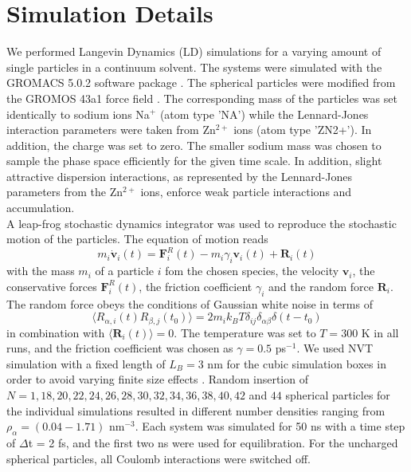 \documentclass[aip,jcp,reprint]{revtex4-1}
\begin{document}
\section{Simulation Details}
We performed  Langevin Dynamics (LD) simulations for a varying amount of single particles in a continuum solvent. The systems were simulated with the GROMACS 5.0.2 software package \cite{vanderspoel05a,gromacs08a,pronk13a}.
The spherical particles were modified from the GROMOS 43a1 force field \cite{gunsteren96a}. The corresponding mass of the particles was set identically to sodium ions Na$^+$ (atom type 'NA') while the Lennard-Jones interaction parameters were taken from Zn$^{2+}$ ions (atom type 'ZN2+'). In addition, the charge was set to zero. The smaller sodium mass was chosen to sample the phase space efficiently for the given time scale. In addition, slight attractive dispersion interactions, as represented by the Lennard-Jones parameters from the Zn$^{2+}$ ions, enforce weak particle interactions and accumulation.\\
A leap-frog stochastic dynamics integrator \cite{vangunsteren88a} was used to reproduce the stochastic motion of the particles. The equation of motion reads
\begin{equation}
 \label{eq:LD}
 m_i\dot{\textbf{v}}_i(t) = {\textbf{F}}_i^R(t)-m_i\gamma_i{\textbf{v}}_i(t)+{\textbf{R}}_i(t)
\end{equation}
with the mass $m_i$ of a particle $i$ fom the chosen species, the velocity $\textbf{v}_i$, the conservative forces $ {\textbf{F}}_i^R(t)$, the friction coefficient $\gamma_i$ and the random force ${\textbf{R}}_i$. The random force obeys the conditions of Gaussian white noise in terms of
\begin{equation}
    \langle R_{\alpha,i}(t)R_{\beta,j}(t_0)\rangle = 2 m_i k_BT \delta_{ij}\delta_{\alpha\beta}\delta(t-t_0)
\end{equation}
in combination with  $\langle {\textbf{R}}_i(t)\rangle = 0 $. The temperature was set to $T=300$ K in all runs, and the friction coefficient was chosen as $\gamma = 0.5$ ps$^{-1}$.
We used NVT simulation with a fixed length of $L_B = 3$ nm for the cubic simulation boxes in order to avoid varying finite size effects  \cite{yeh04a}. Random insertion of $N=1, 18, 20, 22, 24, 26, 28, 30, 32,34,36, 38, 40, 42$ and $44$ spherical particles for the individual simulations resulted in different number densities ranging from $\rho_{\alpha} =  (0.04 - 1.71)$ nm$^{-3}$. Each system was simulated for 50 ns with a time step of $\Delta$t = 2 fs, and the first two ns were used for equilibration. For the uncharged spherical particles, all Coulomb interactions were switched off.\\
\end{document}
